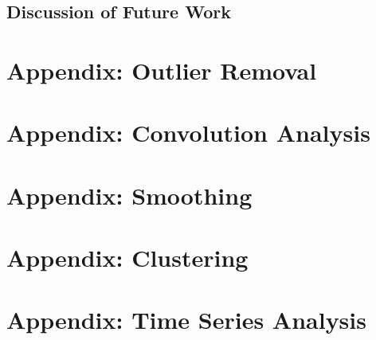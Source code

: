 \documentclass[11pt]{article}
\begin{document}
		
		
	\subsection{Discussion of Future Work}
	
		
		


\appendix

\section{Appendix: Outlier Removal} \label{app_outliers}



\section{Appendix: Convolution Analysis} \label{app_convolution}



\section{Appendix: Smoothing} \label{app_smoothing}



\section{Appendix: Clustering} \label{app_clustering}



\section{Appendix: Time Series Analysis} \label{app_time}




\end{document}
